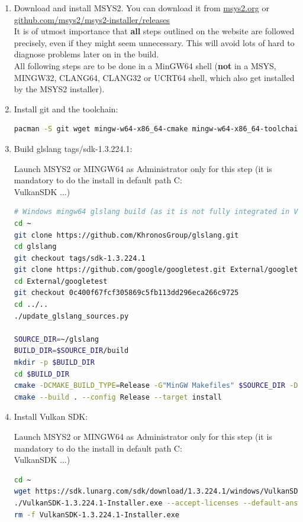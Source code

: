 \begin{enumerate}

\item Download and install MSYS2. You can download it from \href{https://www.msys2.org/}{msys2.org} or \href{https://github.com/msys2/msys2-installer/releases}{github.com/msys2/msys2-installer/releases}\\
It is of utmost importance that \textbf{all} steps outlined on the website are followed precisely, even if they might
seem unnecessary.
This will avoid lots of hard to diagnose problems later on in the build.\\

All following steps are to be done in a MinGW64 shell (\textbf{not} in a MSYS, MINGW32, CLANG64, CLANG32 or UCRT64 shell,
which also get installed by the MSYS2 installer).

\item Install git and the toolchain:

\begin{lstlisting}[language=sh, numbers=none]
pacman -S git wget mingw-w64-x86_64-cmake mingw-w64-x86_64-toolchain
\end{lstlisting}

\item Build glslang tags/sdk-1.3.224.1:

Launch MSYS2 or MINGW64 as Administrator only for this step (it is mandatory to do the install in default path C:\\VulkanSDK ...)
\begin{lstlisting}[language=sh, numbers=none]
# Windows mingw64 glslang build (as it is not fully integrated in VulkanSDK-1.3.224.1 for Windows and built with Visual Studio 2017)
cd ~
git clone https://github.com/KhronosGroup/glslang.git
cd glslang
git checkout tags/sdk-1.3.224.1
git clone https://github.com/google/googletest.git External/googletest
cd External/googletest
git checkout 0c400f67fcf305869c5fb113dd296eca266c9725
cd ../..
./update_glslang_sources.py

SOURCE_DIR=~/glslang
BUILD_DIR=$SOURCE_DIR/build
mkdir -p $BUILD_DIR
cd $BUILD_DIR
cmake -DCMAKE_BUILD_TYPE=Release -G"MinGW Makefiles" $SOURCE_DIR -DCMAKE_INSTALL_PREFIX="$(pwd)/install"
cmake --build . --config Release --target install
\end{lstlisting}

\item Install Vulkan SDK:

Launch MSYS2 or MINGW64 as Administrator only for this step (it is mandatory to do the install in default path C:\\VulkanSDK ...)
\begin{lstlisting}[language=sh, numbers=none]
cd ~
wget https://sdk.lunarg.com/sdk/download/1.3.224.1/windows/VulkanSDK-1.3.224.1-Installer.exe
./VulkanSDK-1.3.224.1-Installer.exe --accept-licenses --default-answer --confirm-command install
rm -f VulkanSDK-1.3.224.1-Installer.exe
\end{lstlisting}


\end{enumerate}
